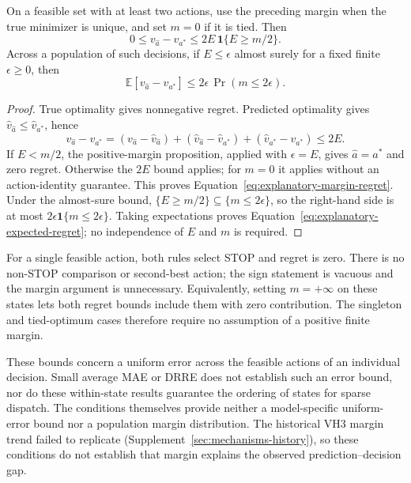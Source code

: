 \begin{proposition}
\label{prop:margin-regret}
On a feasible set with at least two actions, use the preceding margin when
the true minimizer is unique, and set $m=0$ if it is tied. Then
\begin{equation}
 0\leq v_{\widehat a}-v_{a^*}
 \leq 2E\,\mathbf 1\{E\geq m/2\}.
 \label{eq:explanatory-margin-regret}
\end{equation}
Across a population of such decisions, if $E\leq\epsilon$ almost surely
for a fixed finite $\epsilon\geq0$, then
\begin{equation}
 \mathbb E[v_{\widehat a}-v_{a^*}]
 \leq 2\epsilon\,\Pr(m\leq2\epsilon).
 \label{eq:explanatory-expected-regret}
\end{equation}
\end{proposition}
\begin{proof}
True optimality gives nonnegative regret. Predicted optimality gives
$\widehat v_{\widehat a}\leq\widehat v_{a^*}$, hence
\[
 v_{\widehat a}-v_{a^*}
 =(v_{\widehat a}-\widehat v_{\widehat a})
  +(\widehat v_{\widehat a}-\widehat v_{a^*})
  +(\widehat v_{a^*}-v_{a^*})\leq2E.
\]
If $E<m/2$, the positive-margin proposition, applied with $\epsilon=E$,
gives $\widehat a=a^*$ and zero regret. Otherwise the $2E$ bound applies;
for $m=0$ it applies without an action-identity guarantee. This proves
Equation~\ref{eq:explanatory-margin-regret}. Under the almost-sure bound,
$\{E\geq m/2\}\subseteq\{m\leq2\epsilon\}$, so the right-hand side is
at most $2\epsilon\mathbf 1\{m\leq2\epsilon\}$. Taking expectations
proves Equation~\ref{eq:explanatory-expected-regret}; no independence of
$E$ and $m$ is required.
\end{proof}

For a single feasible action, both rules select STOP and regret is zero.
There is no non-STOP comparison or second-best action; the sign statement
is vacuous and the margin argument is unnecessary. Equivalently, setting
$m=+\infty$ on these states lets both regret bounds include them with zero
contribution. The singleton and tied-optimum cases therefore require no
assumption of a positive finite margin.

These bounds concern a uniform error across the feasible actions of an
individual decision. Small average MAE or DRRE does not establish such an
error bound, nor do these within-state results guarantee the ordering of
states for sparse dispatch. The conditions themselves provide neither a
model-specific uniform-error bound nor a population margin distribution.
The historical VH3 margin trend failed to replicate
(Supplement~\ref{sec:mechanisms-history}), so these conditions do not
establish that margin explains the observed prediction--decision gap.
